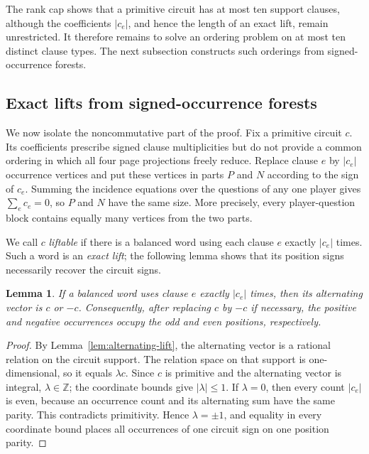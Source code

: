 \documentclass[11pt]{article}
\newtheorem{lemma}[theorem]{Lemma}
\theoremstyle{definition}
\theoremstyle{remark}
\newcommand{\Z}{\mathbb{Z}}
\numberwithin{equation}{section}
\begin{document}
The rank cap shows that a primitive circuit has at most ten support clauses,
although the coefficients \(\lvert c_e\rvert\), and hence the length of an
exact lift, remain unrestricted.  It therefore remains to solve an ordering
problem on at most ten distinct clause types.  The next subsection constructs
such orderings from signed-occurrence forests.

\subsection{Exact lifts from signed-occurrence forests}\label{sec:forests}

We now isolate the noncommutative part of the proof.  Fix a primitive circuit
\(c\).  Its coefficients prescribe signed clause multiplicities but do not
provide a common ordering in which all four page projections freely reduce.  Replace clause
\(e\) by \(\lvert c_e\rvert\) occurrence vertices and put these vertices in
parts \(P\) and \(N\) according to the sign of \(c_e\).  Summing the incidence
equations over the questions of any one player gives \(\sum_e c_e=0\), so
\(P\) and \(N\) have the same size.  More precisely, every player-question
block contains equally many vertices from the two parts.

We call \(c\) \emph{liftable} if there is a balanced word using each clause
\(e\) exactly \(\lvert c_e\rvert\) times.  Such a word is an \emph{exact
lift}; the following lemma shows that its position signs necessarily recover
the circuit signs.

\begin{lemma}\label{lem:exact-multiplicity}
If a balanced word uses clause \(e\) exactly \(\lvert c_e\rvert\) times, then
its alternating vector is \(c\) or \(-c\).  Consequently, after replacing
\(c\) by \(-c\) if necessary, the positive and negative occurrences occupy
the odd and even positions, respectively.
\end{lemma}

\begin{proof}
By Lemma~\ref{lem:alternating-lift}, the alternating vector is a rational
relation on the circuit support.  The relation space on that support is
one-dimensional, so it equals \(\lambda c\).  Since \(c\) is primitive and
the alternating vector is integral, \(\lambda\in\Z\); the coordinate bounds
give \(\lvert\lambda\rvert\leq1\).  If \(\lambda=0\), then every count
\(\lvert c_e\rvert\) is even, because an occurrence count and its alternating
sum have the same parity.  This contradicts primitivity.  Hence
\(\lambda=\pm1\), and equality in every coordinate bound places all
occurrences of one circuit sign on one position parity.
\end{proof}
\end{document}
